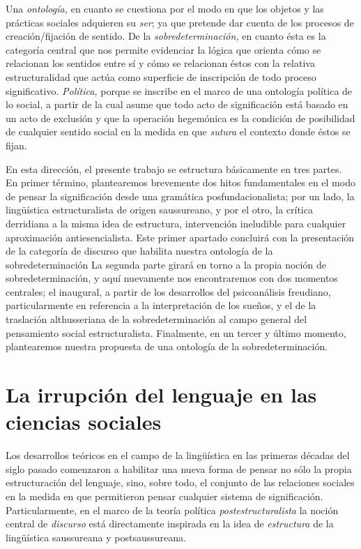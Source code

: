Una \emph{ontología,} en cuanto se cuestiona por el modo en que los objetos y las prácticas sociales adquieren su \emph{ser}; ya que pretende dar cuenta de los procesos de creación/fijación de sentido. De la \emph{sobredeterminación,} en cuanto ésta es la categoría central que nos permite evidenciar la lógica que orienta cómo se relacionan los sentidos  entre sí y cómo se relacionan éstos con la relativa estructuralidad que actúa como superficie de inscripción de todo proceso significativo. \emph{Política,} porque se inscribe en el marco de una ontología política de lo social, a partir de la cual asume que todo acto de significación está basado en un acto de exclusión y que la operación hegemónica es la condición de posibilidad de cualquier sentido social en la medida en que \emph{sutura} el contexto donde éstos se fijan.

En esta dirección, el presente trabajo se estructura básicamente en tres partes. En primer término, plantearemos brevemente dos hitos fundamentales en el modo de pensar la significación desde una gramática posfundacionalista; por un lado, la lingüística estructuralista de origen saussureano, y por el otro, la crítica derridiana a la misma idea de estructura, intervención ineludible para cualquier aproximación antiesencialista. Este primer apartado concluirá con la presentación de la categoría de discurso que habilita nuestra ontología de la sobredeterminación La segunda parte girará en torno a la propia noción de sobredeterminación, y aquí nuevamente nos encontraremos con dos momentos centrales; el inaugural, a partir de los desarrollos del psicoanálisis freudiano, particularmente en referencia a la interpretación de los sueños, y el de la traslación althusseriana de la sobredeterminación al campo general del pensamiento social estructuralista. Finalmente, en un tercer y último momento, plantearemos nuestra propuesta de una ontología de la sobredeterminación.

\section{La irrupción del lenguaje en las ciencias sociales}

Los desarrollos teóricos en el campo de la lingüística en las primeras décadas del siglo pasado comenzaron a habilitar una nueva forma de pensar no sólo la propia estructuración del lenguaje, sino, sobre todo, el conjunto de las relaciones sociales en la medida en que permitieron pensar cualquier sistema de significación. Particularmente, en el marco de la teoría política \emph{postestructuralista} la noción central de \emph{discurso} está directamente inspirada en la idea de \emph{estructura} de la lingüística saussureana y postsaussureana.

